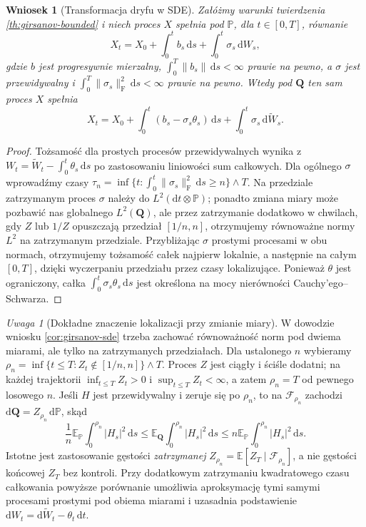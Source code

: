 \documentclass[11pt,a4paper,oneside]{report}
\numberwithin{equation}{chapter}
\theoremstyle{plain}
\newtheorem{wniosek}[twierdzenie]{Wniosek}
\theoremstyle{definition}
\theoremstyle{remark}
\newtheorem{uwaga}{Uwaga}[chapter]
\newcommand{\Prob}{\mathbb{P}}
\newcommand{\E}{\mathbb{E}}
\newcommand{\calF}{\mathcal{F}}
\newcommand{\dd}{\mathrm{d}}
\newcommand{\norm}[1]{\lVert #1\rVert}
\begin{document}
\begin{wniosek}[Transformacja dryfu w SDE]\label{cor:volIII:08:01}
\label{cor:girsanov-sde}
Załóżmy warunki twierdzenia \ref{th:girsanov-bounded}
i niech proces $X$ spełnia pod $\Prob$, dla
$t\in[0,T]$, równanie
\[
X_t=X_0+\int_0^tb_s\,\dd s+\int_0^t\sigma_s\,\dd W_s,
\]
gdzie $b$ jest progresywnie mierzalny,
$\int_0^T\norm{b_s}\,\dd s<\infty$ prawie na pewno,
a $\sigma$ jest przewidywalny i
$\int_0^T\norm{\sigma_s}_{\mathrm F}^2\,\dd s<\infty$
prawie na pewno. Wtedy pod $\mathbf Q$ ten sam proces $X$
spełnia
\[
X_t=X_0+\int_0^t(b_s-\sigma_s\theta_s)\,\dd s
        +\int_0^t\sigma_s\,\dd\widetilde W_s.
\tag{8.8}\label{eq:girsanov-sde}
\]
\end{wniosek}
\begin{proof}
Tożsamość dla prostych procesów przewidywalnych wynika
z $W_t=\widetilde W_t-\int_0^t\theta_s\,\dd s$
po zastosowaniu liniowości sum całkowych.
Dla ogólnego $\sigma$ wprowadźmy czasy
$\tau_n=\inf\{t:\int_0^t\norm{\sigma_s}_{\mathrm F}^2\,\dd s\ge n\}\wedge T$.
Na przedziale zatrzymanym proces $\sigma$ należy do
$L^2(\dd t\otimes\Prob)$; ponadto zmiana miary może
pozbawić nas globalnego $L^2(\mathbf Q)$, ale przez
zatrzymanie dodatkowo w chwilach, gdy $Z$ lub $1/Z$
opuszczają przedział $[1/n,n]$, otrzymujemy równoważne
normy $L^2$ na zatrzymanym przedziale.
Przybliżając $\sigma$ prostymi procesami w obu normach,
otrzymujemy tożsamość całek najpierw lokalnie, a następnie
na całym $[0,T]$, dzięki wyczerpaniu przedziału przez
czasy lokalizujące. Ponieważ $\theta$ jest ograniczony,
całka $\int_0^t\sigma_s\theta_s\,\dd s$ jest określona
na mocy nierówności Cauchy'ego--Schwarza.
\end{proof}


\begin{uwaga}[Dokładne znaczenie lokalizacji przy zmianie miary]
W dowodzie wniosku \ref{cor:girsanov-sde} trzeba zachować
równoważność norm pod dwiema miarami, ale tylko na
zatrzymanych przedziałach. Dla ustalonego $n$ wybieramy
$\rho_n=\inf\{t\le T:Z_t\notin[1/n,n]\}\wedge T$.
Proces $Z$ jest ciągły i ściśle dodatni; na każdej trajektorii
$\inf_{t\le T}Z_t>0$ i $\sup_{t\le T}Z_t<\infty$,
a zatem $\rho_n=T$ od pewnego losowego $n$.
Jeśli $H$ jest przewidywalny i zeruje się po $\rho_n$,
to na $\calF_{\rho_n}$ zachodzi
$\dd\mathbf Q=Z_{\rho_n}\,\dd\Prob$, skąd
\[
  \frac1n\E_{\Prob}\int_0^{\rho_n}|H_s|^2\,\dd s
 \le \E_{\mathbf Q}\int_0^{\rho_n}|H_s|^2\,\dd s
 \le n\E_{\Prob}\int_0^{\rho_n}|H_s|^2\,\dd s.
\]
Istotne jest zastosowanie gęstości \emph{zatrzymanej}
$Z_{\rho_n}=\E[Z_T\mid\calF_{\rho_n}]$,
a nie gęstości końcowej $Z_T$ bez kontroli.
Przy dodatkowym zatrzymaniu kwadratowego czasu całkowania
powyższe porównanie umożliwia aproksymację tymi samymi
procesami prostymi pod obiema miarami i uzasadnia
podstawienie $\dd W_t=\dd\widetilde W_t-\theta_t\,\dd t$.
\end{uwaga}
\end{document}
